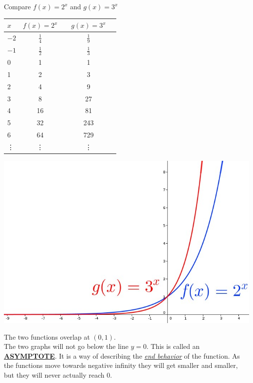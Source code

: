 \documentclass[12pt]{article}
\begin{document}
Compare $f(x)=2^x$ and $g(x)=3^x$

\begin{center}
\begin{tabular}{ l | c | c | c | c }
  \textbf{$x$} & $f(x)=2^x$ & \hspace{1cm} & $g(x)=3^x$ \\ \hline
  $-2$ & $\frac{1}{4}$ & & $\frac{1}{9}$\\ \hline
  $-1$ & $\frac{1}{2}$ & & $\frac{1}{3}$\\ \hline
  0  & 1 & & 1\\ \hline
  1  & 2 & & 3\\ \hline
  2  & 4 & & 9\\ \hline
  3  & 8 & & 27\\ \hline
  4  & 16 & & 81\\ \hline
  5  & 32 & & 243\\ \hline
  6  & 64 & & 729\\ \hline
  \vdots & \vdots & &\vdots
\end{tabular}
\end{center}

\begin{center}
\includegraphics[scale=.5]{exponential.jpg}
\end{center}

The two functions overlap at \underline{$(0,1)$}.\\

The two graphs will not go below the line \underline{$y=0$}. This is called an \underline{\textbf{ASYMPTOTE}}. It is a way of describing the \underline{\textit{end behavior}} of the function. As the functions move towards negative infinity they will get smaller and smaller,  but they will never actually reach 0.\\
\end{document}
